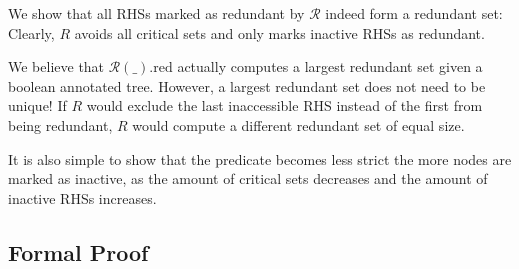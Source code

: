 We show that all RHSs marked as redundant by $\mathcal{R}$ indeed form a redundant set: Clearly, $R$ avoids all critical sets and only marks inactive RHSs as redundant.

We believe that $\mathcal{R}(\_).\mathrm{red}$ actually computes a largest redundant set given a boolean annotated tree.
However, a largest redundant set does not need to be unique!
If $R$ would exclude the last inaccessible RHS instead of the first from being redundant, $R$ would compute a different redundant set of equal size.

It is also simple to show that the predicate becomes less strict the more nodes are marked as inactive, as the amount of critical sets decreases and the amount of inactive RHSs increases.

\subsection{Formal Proof}


